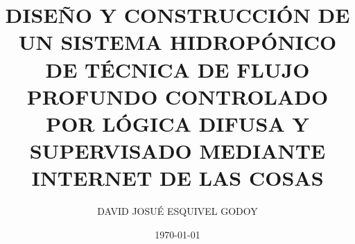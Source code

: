 \documentclass[twoside,spanish,ESP,MSc]{plantillaLabUPV}
\title {DISEÑO Y CONSTRUCCIÓN DE UN SISTEMA HIDROPÓNICO DE TÉCNICA DE FLUJO PROFUNDO CONTROLADO POR LÓGICA DIFUSA Y SUPERVISADO MEDIANTE INTERNET DE LAS COSAS}
\author      	{DAVID JOSU\'{E} ESQUIVEL GODOY}
\date           	{\today}
\theoremstyle{definition}
\begin{document}
\makeintropages %














\end{document}
